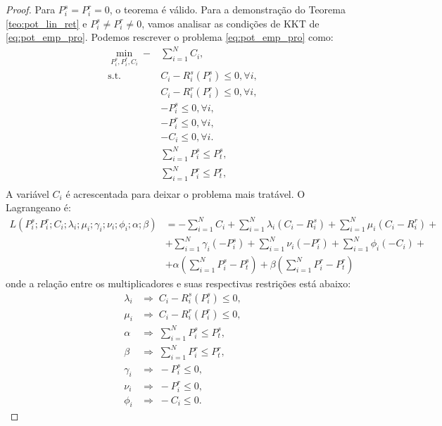 \begin{proof}
    Para $P_i^s=P_i^r=0$, o teorema é válido. Para a demonstração do Teorema \ref{teo:pot_lin_ret} e $P_i^s\neq P_i^r\neq 0$, vamos analisar as condições de \ac{KKT} de \eqref{eq:pot_emp_pro}. Podemos rescrever o problema \eqref{eq:pot_emp_pro} como:
    \begin{subequations}\label{eq:prob_aux}
            \begin{align}
                    \min_{P_i^s,P_i^r,C_i} - &\sum_{i=1}^NC_i,\\
                    \text{s.t.}\quad & C_i - R_i^s(P_i^s) \leq 0, \forall i, \\
                      &C_i - R_i^r(P_i^r) \leq 0, \forall i, \\
                      &-P_i^s \leq 0, \forall i,\\
                      &-P_i^r \leq 0, \forall i, \\
                      &-C_{i} \leq 0, \forall i.\\
                      &\sum_{i=1}^N P_i^s \leq P_{t}^s,\\
                      &\sum_{i=1}^N P_i^r \leq P_{t}^r,\\
            \end{align}
    \end{subequations}
    A variável $C_i$ é acrescentada para deixar o problema mais tratável. O Lagrangeano é:
    \begin{equation}
            \begin{split}
                    L(P_i^s; P_i^r; C_i;\lambda_i;\mu_i;\gamma_i;\nu_i;\phi_i;\alpha;\beta) &= -\sum_{i=1}^N C_i +\sum_{i=1}^N \lambda_i(C_i - R_i^s) +\sum_{i=1}^N \mu_i(C_i - R_i^r) + \\
                    & + \sum_{i=1}^N \gamma_i(-P_i^s) + \sum_{i=1}^N \nu_i(-P_i^r) + \sum_{i=1}^N \phi_i(-C_{i}) + \\ 
        & + \alpha\left(\sum_{i=1}^NP_i^s - P_{t}^s\right) + \beta\left(\sum_{i=1}^NP_i^r - P_{t}^r\right)
            \end{split}
    \end{equation}
    onde a relação entre os multiplicadores e suas respectivas restrições está abaixo:
    \begin{subequations}\label{eq:lag_mul}
        \begin{align}
              \lambda_i &\Rightarrow\; C_i - R_i^s(P_i^s) \leq 0,\\
              \mu_i &\Rightarrow\; C_i - R_i^r(P_i^r) \leq 0,\\
              \alpha &\Rightarrow\; \sum_{i=1}^N P_i^s \leq P_{t}^s,\\
              \beta &\Rightarrow\;  \sum_{i=1}^N P_i^r \leq P_{t}^r,\\
              \gamma_i &\Rightarrow\; -P_i^s \leq 0,\\
              \nu_i &\Rightarrow\; -P_i^r \leq 0,\\
              \phi_i &\Rightarrow\; -C_i \leq 0.
        \end{align} 
    \end{subequations}


\end{proof}

